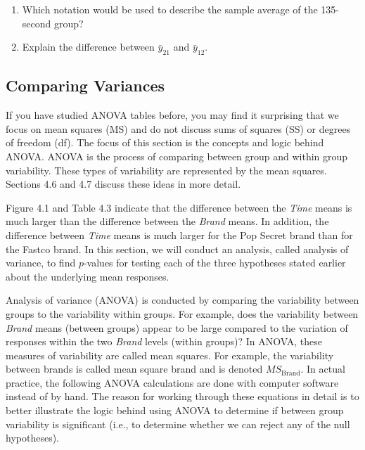 \documentclass[
]{report}
\begin{document}
\begin{enumerate}
\def\labelenumi{\arabic{enumi}.}
\setcounter{enumi}{5}
\item
  Which notation would be used to describe the sample average of the 135-second group?
\item
  Explain the difference between \(\scriptstyle \bar{y}_{21}\) and \(\scriptstyle \bar{y}_{12}\).
\end{enumerate}

\hypertarget{comparing-variances}{%
\subsection*{Comparing Variances}\label{comparing-variances}}

If you have studied ANOVA tables before, you may find it surprising that we focus on mean squares (MS) and do not discuss sums of squares (SS) or degrees of freedom (df). The focus of this section is the concepts and logic behind ANOVA. ANOVA is the process of comparing between group and within group variability. These types of variability are represented by the mean squares. Sections 4.6 and 4.7 discuss these ideas in more detail.

Figure 4.1 and Table 4.3 indicate that the difference between the \emph{Time} means is much larger than the difference between the \emph{Brand} means. In addition, the difference between \emph{Time} means is much larger for the Pop Secret brand than for the Fastco brand. In this section, we will conduct an analysis, called analysis of variance, to find \(\scriptstyle p\)-values for testing each of the three hypotheses stated earlier about the underlying mean responses.

Analysis of variance (ANOVA) is conducted by comparing the variability between groups to the variability within groups. For example, does the variability between \emph{Brand} means (between groups) appear to be large compared to the variation of responses within the two \emph{Brand} levels (within groups)? In ANOVA, these measures of variability are called mean squares. For example, the variability between brands is called mean square brand and is denoted \(\scriptstyle MS_{\text{Brand}}\). In actual practice, the following ANOVA calculations are done with computer software instead of by hand. The reason for working through these equations in detail is to better illustrate the logic behind using ANOVA to determine if between group variability is significant (i.e., to determine whether we can reject any of the null hypotheses).
\end{document}
